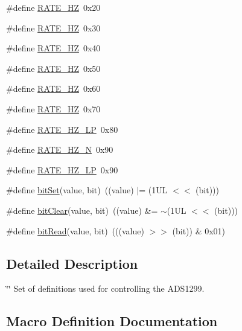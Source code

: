 \begin{DoxyCompactItemize}
\#define \hyperlink{group___definitions___a_d_s1299_ga0e2e3efa513f8b39538c9c661eeaf418}{R\+A\+T\+E\+\_\+H\+Z}~0x20
\item 
\#define \hyperlink{group___definitions___a_d_s1299_gaba5dab338622c131966c251c4a2692be}{R\+A\+T\+E\+\_\+H\+Z}~0x30
\item 
\#define \hyperlink{group___definitions___a_d_s1299_ga1d3326754c4b4c925152f977a5fadcd2}{R\+A\+T\+E\+\_\+H\+Z}~0x40
\item 
\#define \hyperlink{group___definitions___a_d_s1299_ga78010f1820cf890267eed537898bb45f}{R\+A\+T\+E\+\_\+H\+Z}~0x50
\item 
\#define \hyperlink{group___definitions___a_d_s1299_ga9df81d214b9f91c9820238985e5a9794}{R\+A\+T\+E\+\_\+H\+Z}~0x60
\item 
\#define \hyperlink{group___definitions___a_d_s1299_ga0d6c881d40fb788392a4e3f19ff927e8}{R\+A\+T\+E\+\_\+H\+Z}~0x70
\item 
\#define \hyperlink{group___definitions___a_d_s1299_gaa21e3b24831cab7ee1e91e047af52946}{R\+A\+T\+E\+\_\+H\+Z\+\_\+\+L\+P}~0x80
\item 
\#define \hyperlink{group___definitions___a_d_s1299_ga03406f4692c8aeb53586c45156d79288}{R\+A\+T\+E\+\_\+H\+Z\+\_\+\+N}~0x90
\item 
\#define \hyperlink{group___definitions___a_d_s1299_gaef241f3152a18697f20595938af227e0}{R\+A\+T\+E\+\_\+H\+Z\+\_\+\+L\+P}~0x90
\item 
\#define \hyperlink{group___definitions___a_d_s1299_ga6a8195c0e930f86c6af03ba6af8b41dd}{bit\+Set}(value,  bit)~((value) $\vert$= (1\+U\+L $<$$<$ (bit)))
\item 
\#define \hyperlink{group___definitions___a_d_s1299_gabbe843c0521806a4ab2e7cffe44769e2}{bit\+Clear}(value,  bit)~((value) \&= $\sim$(1\+U\+L $<$$<$ (bit)))
\item 
\#define \hyperlink{group___definitions___a_d_s1299_gaff20d8c0a05ad3043afa2e4ad9ebe768}{bit\+Read}(value,  bit)~(((value) $>$$>$ (bit)) \& 0x01)
\end{DoxyCompactItemize}


\subsection{Detailed Description}
\char`\"{}\char`\"{} Set of definitions used for controlling the A\+D\+S1299. 

\subsection{Macro Definition Documentation}
\hypertarget{group___definitions___a_d_s1299_ga0902995cb5c5c4c46e34653033f74e08}{}
